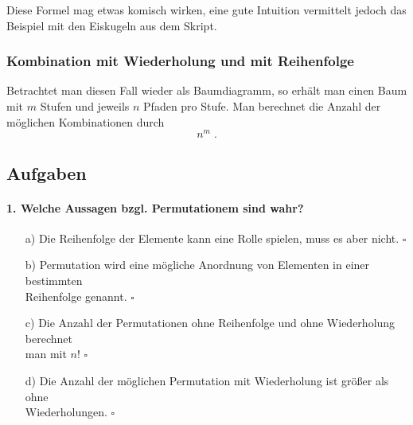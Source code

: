 \documentclass[a4paper]{article}
\newcommand\dangersign[1][2ex]{%
  \renewcommand\stacktype{L}%
  \scaleto{\stackon[1.3pt]{\color{red}$\triangle$}{\tiny !}}{#1}%
}
\begin{document}
\noindent \dangersign[3ex] Diese Formel mag etwas komisch wirken, eine gute Intuition vermittelt jedoch das Beispiel mit den Eiskugeln aus dem Skript.

\subsubsection{Kombination mit Wiederholung und mit Reihenfolge}
Betrachtet man diesen Fall wieder als Baumdiagramm, so erhält man einen Baum mit $m$ Stufen und jeweils $n$ Pfaden pro Stufe. Man berechnet die Anzahl der möglichen Kombinationen durch $$n^m\;.$$

\clearpage

\subsection{Aufgaben}
\paragraph{1. Welche Aussagen bzgl. Permutationem sind wahr?}
\begin{itemize}
    \item[a)] Die Reihenfolge der Elemente kann eine Rolle spielen, muss es aber nicht. \hfill $\square$
    \item[b)] Permutation wird eine mögliche Anordnung von Elementen in einer bestimmten\\ Reihenfolge genannt.  \hfill $\square$
    \item[c)] Die Anzahl der Permutationen ohne Reihenfolge und ohne Wiederholung berechnet\\ man mit $n!$ \hfill $\square$
    \item[d)] Die Anzahl der möglichen Permutation mit Wiederholung ist größer als ohne\\ Wiederholungen. \hfill $\square$
\end{itemize}
\end{document}
